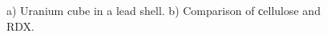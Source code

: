 \documentclass[a4paper]{panl}
\begin{document}
\begin{figure}[t]
    \begin{center}
        \begin{minipage}[h]{0.49\linewidth}
\end{minipage}
\hfill
\begin{minipage}[h]{0.49\linewidth}
\end{minipage} 
        \vspace{-3mm}
        \caption{a) Uranium cube in a lead shell. b) Comparison of сellulose and RDX.}
    \end{center}
    \vspace{-5mm}
\end{figure}
\end{document}
